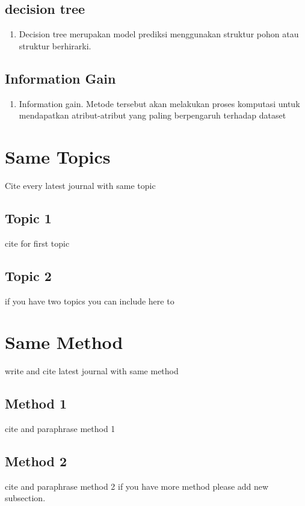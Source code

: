 \subsection{decision tree}
\begin{enumerate}
\item Decision tree merupakan model prediksi menggunakan struktur pohon atau struktur berhirarki.
\end{enumerate}

\subsection{Information Gain}
\begin{enumerate}
\item Information gain. Metode tersebut akan melakukan proses komputasi untuk mendapatkan atribut-atribut yang paling berpengaruh terhadap dataset
\end{enumerate}
\section{Same Topics}
Cite every latest journal with same topic
\subsection{Topic 1}
cite for first topic

\subsection{Topic 2}
if you have two topics you can include here to


\section{Same Method}
write and cite latest journal with same method

\subsection{Method 1}
cite and paraphrase method 1

\subsection{Method 2}
cite and paraphrase method 2 if you have more method please add new subsection.

 

